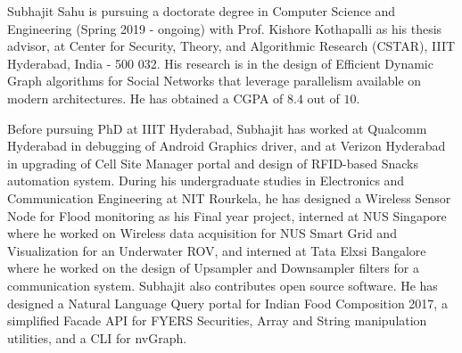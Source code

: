 Subhajit Sahu is pursuing a doctorate degree in Computer Science and Engineering (Spring 2019 - ongoing) with Prof. Kishore Kothapalli as his thesis advisor, at Center for Security, Theory, and Algorithmic Research (CSTAR), IIIT Hyderabad, India - 500 032. His research is in the design of Efficient Dynamic Graph algorithms for Social Networks that leverage parallelism available on modern architectures. He has obtained a CGPA of $8.4$ out of $10$.

\vspace{-3ex}
Before pursuing PhD at IIIT Hyderabad, Subhajit has worked at Qualcomm Hyderabad in debugging of Android Graphics driver, and at Verizon Hyderabad in upgrading of Cell Site Manager portal and design of RFID-based Snacks automation system. During his undergraduate studies in Electronics and Communication Engineering at NIT Rourkela, he has designed a Wireless Sensor Node for Flood monitoring as his Final year project, interned at NUS Singapore where he worked on Wireless data acquisition for NUS Smart Grid and Visualization for an Underwater ROV, and interned at Tata Elxsi Bangalore where he worked on the design of Upsampler and Downsampler filters for a communication system. Subhajit also contributes open source software. He has designed a Natural Language Query portal for Indian Food Composition 2017, a simplified Facade API for FYERS Securities, Array and String manipulation utilities, and a CLI for nvGraph.
